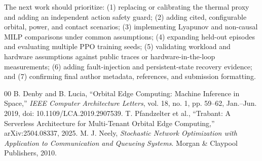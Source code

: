 \documentclass[11pt,letterpaper]{article}
\begin{document}
The next work should prioritize: (1) replacing or calibrating the thermal proxy and adding an independent action safety guard; (2) adding cited, configurable orbital, power, and contact scenarios; (3) implementing Lyapunov and non-causal MILP comparisons under common assumptions; (4) expanding held-out episodes and evaluating multiple PPO training seeds; (5) validating workload and hardware assumptions against public traces or hardware-in-the-loop measurements; (6) adding fault-injection and persistent-state recovery evidence; and (7) confirming final author metadata, references, and submission formatting.

\begin{thebibliography}{00}
 B. Denby and B. Lucia, ``Orbital Edge Computing: Machine Inference in Space,'' \textit{IEEE Computer Architecture Letters}, vol. 18, no. 1, pp. 59--62, Jan.--Jun. 2019, doi: 10.1109/LCA.2019.2907539.
 T. Pfandzelter et al., ``Trabant: A Serverless Architecture for Multi-Tenant Orbital Edge Computing,'' arXiv:2504.08337, 2025.
 M. J. Neely, \textit{Stochastic Network Optimization with Application to Communication and Queueing Systems}. Morgan \& Claypool Publishers, 2010.
\end{thebibliography}
\end{document}
